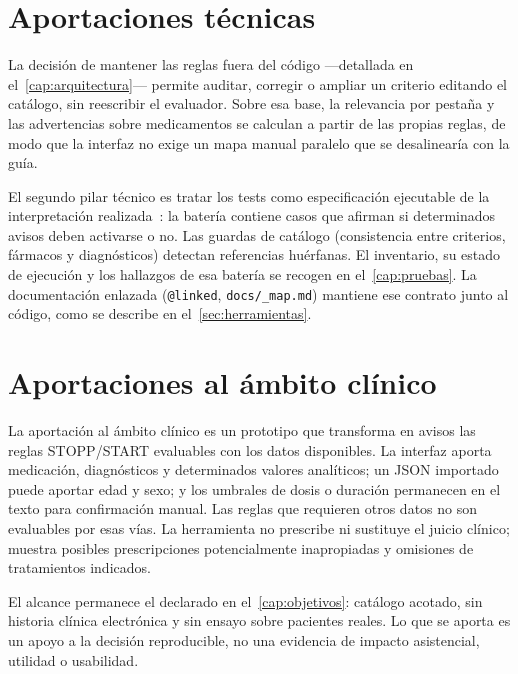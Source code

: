 \section{Aportaciones técnicas}

La decisión de mantener las reglas fuera del código ---detallada en
el~\cref{cap:arquitectura}--- permite auditar, corregir o ampliar un
criterio editando el catálogo, sin reescribir el evaluador. Sobre esa
base, la relevancia por pestaña y las advertencias sobre medicamentos se
calculan a partir de las propias reglas, de modo que la interfaz no
exige un mapa manual paralelo que se desalinearía con la guía.

El segundo pilar técnico es tratar los tests como especificación
ejecutable de la interpretación realizada~\cite{beck2002tdd}: la batería
contiene casos que afirman si determinados avisos deben activarse o no. Las
guardas de
catálogo (consistencia entre criterios, fármacos y diagnósticos)
detectan referencias huérfanas. El inventario, su estado de ejecución y los
hallazgos de esa batería se recogen en el~\cref{cap:pruebas}. La
documentación enlazada (\texttt{@linked}, \texttt{docs/\_map.md}) mantiene
ese contrato junto al código, como se describe en
el~\cref{sec:herramientas}.

\section{Aportaciones al ámbito clínico}

La aportación al ámbito clínico es un prototipo que transforma en avisos las
reglas STOPP/START evaluables con los datos disponibles. La interfaz aporta
medicación, diagnósticos y determinados valores analíticos; un JSON importado
puede aportar edad y sexo; y los umbrales de dosis o duración permanecen en el
texto para confirmación manual. Las reglas que requieren otros datos no son
evaluables por esas vías. La herramienta no prescribe ni sustituye el juicio
clínico; muestra posibles prescripciones potencialmente inapropiadas y
omisiones de tratamientos indicados.

El alcance permanece el declarado en el~\cref{cap:objetivos}: catálogo
acotado, sin historia clínica electrónica y sin ensayo sobre pacientes
reales. Lo que se aporta es un apoyo a la decisión reproducible, no una
evidencia de impacto asistencial, utilidad o usabilidad.

